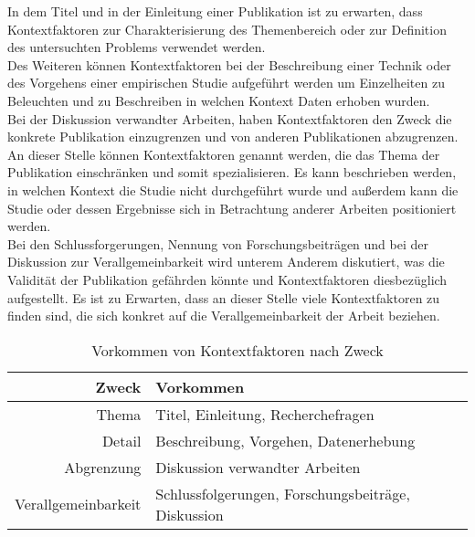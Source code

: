 In dem Titel und in der Einleitung einer Publikation ist zu erwarten, dass Kontextfaktoren zur Charakterisierung des Themenbereich oder zur Definition des untersuchten Problems verwendet werden. \\
Des Weiteren können Kontextfaktoren bei der Beschreibung einer Technik oder des Vorgehens einer empirischen Studie aufgeführt werden um Einzelheiten zu Beleuchten und zu Beschreiben in welchen Kontext Daten erhoben wurden. \\
Bei der Diskussion verwandter Arbeiten, haben Kontextfaktoren den Zweck die konkrete Publikation einzugrenzen und von anderen Publikationen abzugrenzen. An dieser Stelle können Kontextfaktoren genannt werden, die das Thema der Publikation einschränken und somit spezialisieren. Es kann beschrieben werden, in welchen Kontext die Studie nicht durchgeführt wurde und außerdem kann die Studie oder dessen Ergebnisse sich in Betrachtung anderer Arbeiten positioniert werden. \\
Bei den Schlussforgerungen, Nennung von Forschungsbeiträgen und bei der Diskussion zur Verallgemeinbarkeit wird unterem Anderem diskutiert, was die Validität der Publikation gefährden könnte und Kontextfaktoren diesbezüglich aufgestellt. Es ist zu Erwarten, dass an dieser Stelle viele Kontextfaktoren zu finden sind, die sich konkret auf die Verallgemeinbarkeit der Arbeit beziehen. \\

\begin{table}[h!]
\begin{tabular}{ r | l }
 Zweck & Vorkommen \\ 
  \hline
  Thema & Titel, Einleitung, Recherchefragen \\  
  Detail & Beschreibung, Vorgehen, Datenerhebung \\
  Abgrenzung & Diskussion verwandter Arbeiten \\
  Verallgemeinbarkeit & Schlussfolgerungen, Forschungsbeiträge, Diskussion\\
\end{tabular}
\caption{Vorkommen von Kontextfaktoren nach Zweck}
\label{table:vorkommen}
\end{table}

